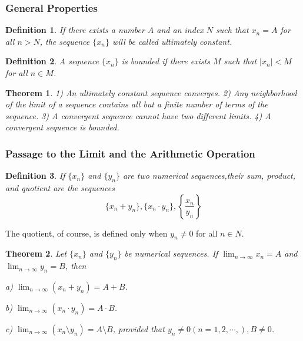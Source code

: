 \documentclass[a4paper,12pt]{article} %
\newtheorem{definition}{Definition}[section]
\newtheorem{theorem}{Theorem}[section]
\begin{document}
\subsubsection{General Properties}
\begin{definition}
    \emph{
    If there exists a number $A$ and an index $N$ such that $x_n = A$
    for all $n>N$, the sequence $\{x_n\}$ will be called ultimately 
    constant.
    }
\end{definition}
\begin{definition}
    \emph{
    A sequence $\{x_n\}$ is bounded if there exists $M$ such that $|x_n| < M$
    for all $n \in M$.
    }
\end{definition}

\begin{theorem}
    \emph{
    1) An ultimately constant sequence converges.
    2) Any neighborhood of the limit of a sequence contains all but 
    a finite number of terms of the sequence.
    3) A convergent sequence cannot have two different limits.
    4) A convergent sequence is bounded.
    }
\end{theorem}

\subsubsection{Passage to the Limit and the Arithmetic Operation}
\begin{definition}
    \emph{
    If $\{x_n\}$ and $\{y_n\}$ are two numerical sequences,their sum, 
    product, and quotient are the sequences
    \[\{x_n+y_n\}, \{x_n \cdot y_n\}, \left\{\frac{x_n}{y_n}\right\}\]
    }
\end{definition}
The quotient, of course, is defined only when $y_n\ne 0$ for all $n \in N$.

\begin{theorem}
    Let $\{x_n\}$ and $\{y_n\}$ be numerical sequences. If $\displaystyle \lim_{n\to \infty}
    x_n =A$ and $\displaystyle \lim_{n\to \infty} y_n =B$, then 

    {\rm a)} $\displaystyle \lim_{n\to \infty}\left(x_n+y_n \right) = A+B$.
    
    {\rm b)} $\displaystyle \lim_{n\to \infty}\left(x_n \cdot y_n \right) = A \cdot B$.

    {\rm c)} $\displaystyle \lim_{n\to \infty}\left(x_n \setminus y_n \right) = A \setminus B$,
    provided that $y_n \ne 0 (n=1,2,\cdots,),B\ne0$.
\end{theorem}
\end{document}
